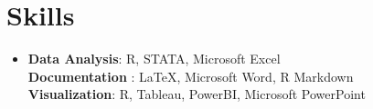 \section{Skills}
 \begin{itemize}[leftmargin=0.4cm, label={}]
    \item{
     \textbf{Data Analysis}{: \small{R, STATA, Microsoft Excel}} \\
     \textbf{Documentation }{: \small{LaTeX, Microsoft Word, R Markdown}} \\
     \textbf{Visualization}{: \small{R, Tableau, PowerBI, Microsoft PowerPoint}} \\
    }
 \end{itemize}
    